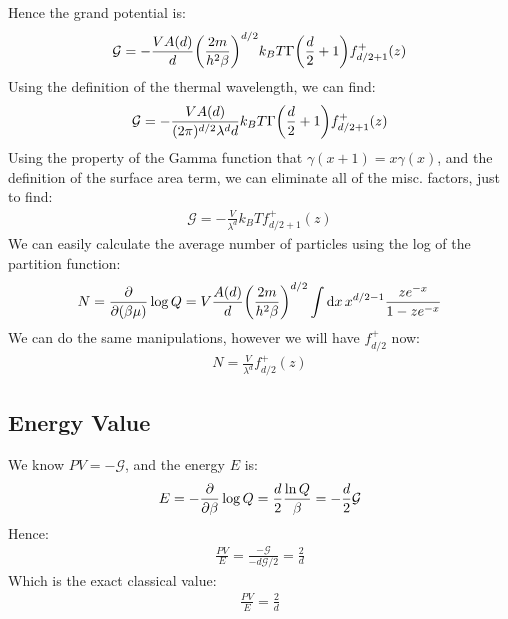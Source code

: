 \documentclass[12pt]{article}
\begin{document}
Hence the grand potential is:
\begin{align*}
  \mathcal{G}=-\frac{V A(d)}{d}\qty(\frac{2m}{h^2\beta})^{d/2}k_BT
  \Gamma\qty(\frac{d}{2}+1)f^+_{d/2+1}(z)
\end{align*}
Using the definition of the thermal wavelength, we can find:
\begin{align*}
  \mathcal{G}=-\frac{V A(d)}{(2\pi)^{d/2}\lambda^dd}k_BT
  \Gamma\qty(\frac{d}{2}+1)f^+_{d/2+1}(z)
\end{align*}
Using the property of the Gamma function that $\gamma(x+1)=x\gamma(x)$, and the definition of the surface area term, we can eliminate all of the misc. factors, just to find:
\begin{align}
  \boxed{\mathcal{G}=-\frac{V}{\lambda^d}k_BTf^+_{d/2+1}(z)}
\end{align}
We can easily calculate the average number of particles using the log of the partition function:
\begin{align*}
  N=\pdv{(\beta\mu)}\log Q=V\frac{A(d)}{d}\qty(\frac{2m}{h^2\beta})^{d/2}
  \int\dd{x}x^{d/2-1}\frac{ze^{-x}}{1-ze^{-x}}
\end{align*}
We can do the same manipulations, however we will have $f^+_{d/2}$ now:
\begin{align}
  \boxed{N=\frac{V}{\lambda^d}f^+_{d/2}(z)}
\end{align}

\subsection{Energy Value}
We know $PV=-\mathcal{G}$, and the energy $E$ is:
\begin{align*}
  E=-\pdv{\beta}\log{Q}=\frac{d}{2}\frac{\ln Q}{\beta}=-\frac{d}{2}\mathcal{G}
\end{align*}
Hence:
\begin{align*}
  \frac{PV}{E}=\frac{-\mathcal{G}}{-d\mathcal{G}/2}=\frac2d
\end{align*}
Which is the exact classical value:
\begin{align}
  \boxed{\frac{PV}{E}=\frac2d}
\end{align}
\end{document}
